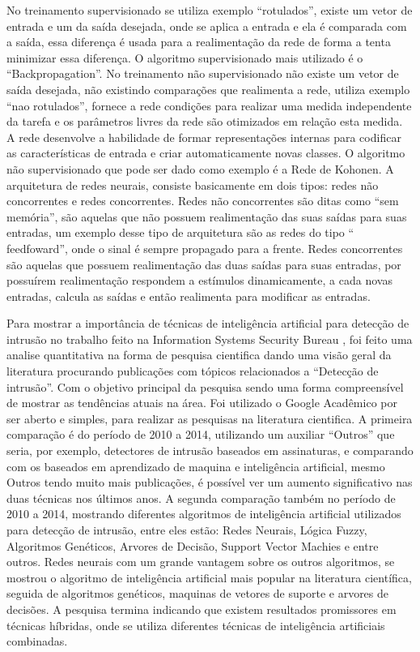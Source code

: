 No treinamento supervisionado se utiliza exemplo “rotulados”, existe um vetor de entrada e um da saída desejada, onde se aplica a entrada e ela é comparada com a saída, essa diferença é usada para a realimentação da rede de forma a tenta minimizar essa diferença. O algoritmo supervisionado mais utilizado é o “Backpropagation”.
No treinamento não supervisionado não existe um vetor de saída desejada, não existindo comparações que realimenta a rede, utiliza exemplo “nao rotulados”, fornece a rede condições  para realizar uma medida independente da tarefa e os parâmetros livres da rede são otimizados em relação esta medida. A rede desenvolve a habilidade de formar representações internas para codificar as características de entrada e criar automaticamente novas classes. O algoritmo não supervisionado que pode ser dado como exemplo é a Rede de Kohonen.
A arquitetura de redes neurais, consiste basicamente em dois tipos: redes não concorrentes e redes concorrentes. 
Redes não concorrentes são ditas como “sem memória”, são aquelas que não possuem realimentação das suas saídas para suas entradas, um exemplo desse tipo de arquitetura são as redes do tipo “ feedfoward”, onde o sinal é sempre propagado para a frente.
Redes concorrentes são aquelas que possuem realimentação das duas saídas para suas entradas, por possuírem realimentação respondem a estímulos dinamicamente, a cada novas entradas, calcula as saídas e então realimenta para modificar as entradas.

Para mostrar a importância de técnicas de inteligência artificial para detecção de intrusão no trabalho feito na Information Systems Security Bureau \cite{Zhang}, foi feito uma analise quantitativa na forma de pesquisa cientifica dando uma visão geral da literatura procurando publicações com tópicos relacionados a “Detecção de intrusão”. 
Com o objetivo principal da pesquisa sendo uma forma compreensível de mostrar as tendências atuais na área. 
Foi utilizado o Google Acadêmico por ser aberto e simples, para realizar as pesquisas na literatura cientifica. 
A primeira comparação é  do período de 2010 a 2014, utilizando um auxiliar “Outros” que seria, por exemplo, detectores de intrusão baseados em assinaturas, e comparando com os baseados em aprendizado de maquina e inteligência artificial, mesmo Outros tendo muito mais publicações, é possível ver um aumento significativo nas duas técnicas nos últimos anos.
A segunda comparação também no período de 2010 a 2014, mostrando diferentes algoritmos de inteligência artificial utilizados para detecção de intrusão, entre eles estão: Redes Neurais, Lógica Fuzzy, Algoritmos Genéticos, Arvores de Decisão, Support Vector Machies e entre outros. 
Redes neurais com um grande vantagem sobre os outros algoritmos, se mostrou o algoritmo de inteligência artificial mais popular na literatura científica, seguida de algoritmos genéticos, maquinas de vetores de suporte e arvores de decisões. 
A pesquisa termina indicando que existem resultados promissores em técnicas híbridas, onde se utiliza diferentes técnicas de inteligência artificiais combinadas.

